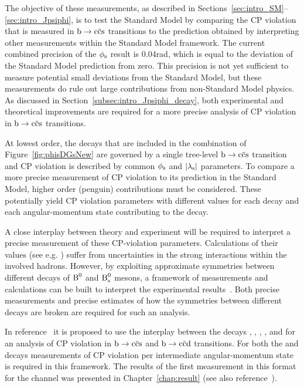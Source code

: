 The objective of these measurements, as described in Sections~\ref{sec:intro_SM}--\ref{sec:intro_Jpsiphi}, is to test the Standard Model by
comparing the CP violation that is measured in $\btoccs$ transitions to the prediction obtained by interpreting other measurements within
the Standard Model framework. The current combined precision of the $\phi_\text{s}$ result is 0.04\unitsp{}rad, which is equal to the deviation of
the Standard Model prediction from zero. This precision is not yet sufficient to measure potential small deviations from the Standard
Model, but these measurements do rule out large contributions from non-Standard Model physics. As discussed in
Section~\ref{subsec:intro_Jpsiphi_decay}, both experimental and theoretical improvements are required for a more precise analysis of CP
violation in $\btoccs$ transitions.

At lowest order, the decays that are included in the combination of Figure~\ref{fig:phisDGsNew} are governed by a single tree-level
$\btoccs$ transition and CP violation is described by common $\phi_\text{s}$ and $|{\lambda_{\text{s}}}|$ parameters. To compare a more precise measurement of CP
violation to its prediction in the Standard Model, higher order (penguin) contributions must be considered. These potentially yield CP
violation parameters with different values for each decay and each angular-momentum state contributing to the \BstoJpsiKK{} decay.

A close interplay between theory and experiment will be required to interpret a precise measurement of these CP-violation parameters.
Calculations of their values (see e.g. \cite{Liu:2013nea}) suffer from uncertainties in the strong interactions within the involved
hadrons. However, by exploiting approximate symmetries between different decays of $\text{B}^\text{0}$ and $\text{B}_\text{s}^\text{0}$ mesons, a framework of measurements
and calculations can be built to interpret the experimental results~\cite{Faller:2008gt,DeBruyn:2014oga}. Both precise measurements and
precise estimates of how the symmetries between different decays are broken are required for such an analysis.

In reference~\cite{DeBruyn:2014oga} it is proposed to use the interplay between the decays \BstoJpsiphi, \BstoJpsiKS, \BstoJpsiKst,
\BdtoJpsiKS, and \BdtoJpsirho{} for an analysis of CP violation in $\btoccs$ and $\btoccd$ transitions. For both the \BstoJpsiphi{} and
\BdtoJpsirho{} decays measurements of CP violation per intermediate angular-momentum state is required in this framework. The results of
the first measurement in this format for the \BstoJpsiphi{} channel was presented in Chapter~\ref{chap:result} (see also
reference~\cite{LHCb-PAPER-2014-059}).


